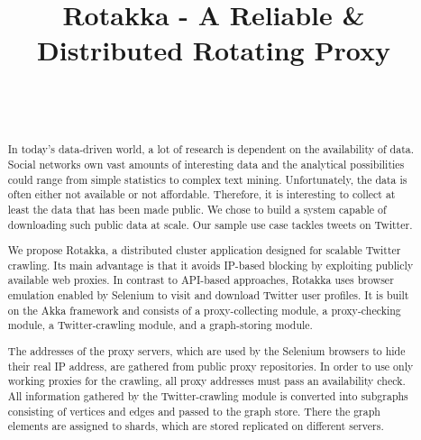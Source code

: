 \documentclass{sigchi}
\def\plaintitle{Rotakka - A Reliable \& Distributed Rotating Proxy}
\begin{document}
\title{\plaintitle}

\author{%
  \\
  \\
}

\maketitle

\begin{abstract}
  In today's data-driven world, a lot of research is dependent on the availability of data. Social networks own vast amounts of interesting data and the analytical possibilities could range from simple statistics to complex text mining. Unfortunately, the data is often either not available or not affordable. Therefore, it is interesting to collect at least the data that has been made public. We chose to build a system capable of downloading such public data at scale. Our sample use case tackles tweets on Twitter.
  
  We propose Rotakka, a distributed cluster application designed for scalable Twitter crawling. Its main advantage is that it avoids IP-based blocking by exploiting publicly available web proxies. In contrast to API-based approaches, Rotakka uses browser emulation enabled by Selenium to visit and download Twitter user profiles. It is built on the Akka framework and consists of a proxy-collecting module, a proxy-checking module, a Twitter-crawling module, and a graph-storing module. 
  
  The addresses of the proxy servers, which are used by the Selenium browsers to hide their real IP address, are gathered from public proxy repositories. In order to use only working proxies for the crawling, all proxy addresses must pass an availability check. All information gathered by the Twitter-crawling module is converted into subgraphs consisting of vertices and edges and passed to the graph store. There the graph elements are assigned to shards, which are stored replicated on different servers.
  
\end{abstract}
\end{document}
